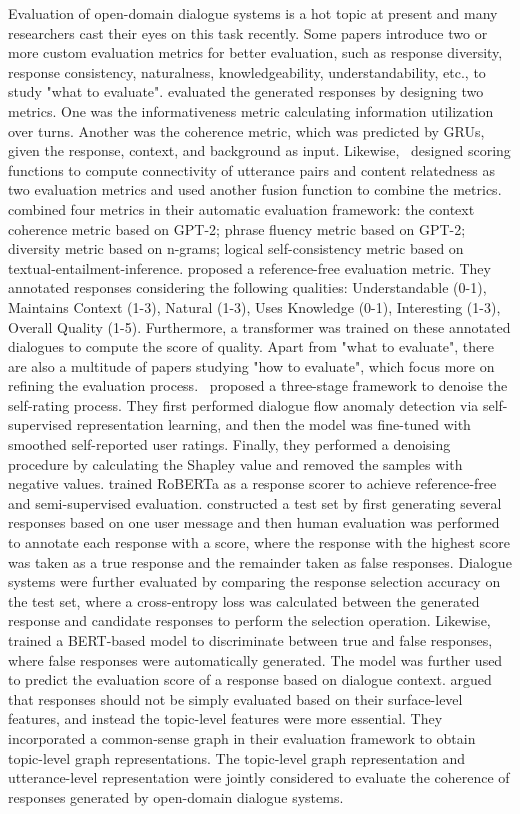 Evaluation of open-domain dialogue systems is a hot topic at present and many researchers cast their eyes on this task recently. Some papers introduce two or more custom evaluation metrics for better evaluation, such as response diversity, response consistency, naturalness, knowledgeability, understandability, etc., to study "what to evaluate".  evaluated the generated responses by designing two metrics. One was the informativeness metric calculating information utilization over turns. Another was the coherence metric, which was predicted by GRUs, given the response, context, and background as input. Likewise,~ designed scoring functions to compute connectivity of utterance pairs and content relatedness as two evaluation metrics and used another fusion function to combine the metrics.  combined four metrics in their automatic evaluation framework: the context coherence metric based on GPT-2; phrase fluency metric based on GPT-2; diversity metric based on n-grams; logical self-consistency metric based on textual-entailment-inference.  proposed a reference-free evaluation metric. They annotated responses considering the following qualities: Understandable (0-1), Maintains Context (1-3), Natural (1-3), Uses Knowledge (0-1), Interesting (1-3), Overall Quality (1-5). Furthermore, a transformer was trained on these annotated dialogues to compute the score of quality. 
Apart from "what to evaluate", there are also a multitude of papers studying "how to evaluate", which focus more on refining the evaluation process.~ proposed a three-stage framework to denoise the self-rating process. They first performed dialogue flow anomaly detection via self-supervised representation learning, and then the model was fine-tuned with smoothed self-reported user ratings. Finally, they performed a denoising procedure by calculating the Shapley value and removed the samples with negative values.  trained RoBERTa as a response scorer to achieve reference-free and semi-supervised evaluation.  constructed a test set by first generating several responses based on one user message and then human evaluation was performed to annotate each response with a score, where the response with the highest score was taken as a true response and the remainder taken as false responses. Dialogue systems were further evaluated by comparing the response selection accuracy on the test set, where a cross-entropy loss was calculated between the generated response and candidate responses to perform the selection operation. Likewise,~ trained a BERT-based model to discriminate between true and false responses, where false responses were automatically generated. The model was further used to predict the evaluation score of a response based on dialogue context.  argued that responses should not be simply evaluated based on their surface-level features, and instead the topic-level features were more essential. They incorporated a common-sense graph in their evaluation framework to obtain topic-level graph representations. The topic-level graph representation and utterance-level representation were jointly considered to evaluate the coherence of responses generated by open-domain dialogue systems. 
